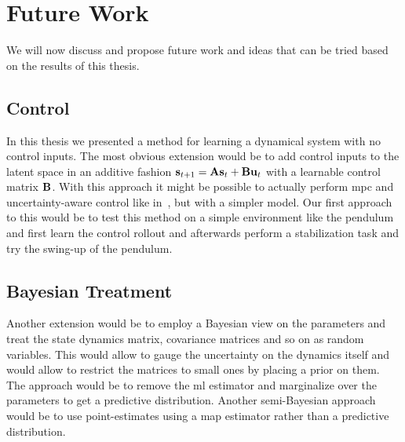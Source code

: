 
%

\section{Future Work}
	\label{sec:futureWork}

	We will now discuss and propose future work and ideas that can be tried based on the results of this thesis.

	\subsection{Control}
		In this thesis we presented a method for learning a dynamical system with no control inputs. The most obvious extension would be to add control inputs to the latent space in an additive fashion \( \boldsymbol{\mathrm{s}}_{t + 1} = \boldsymbol{\mathrm{A}} \boldsymbol{\mathrm{s}}_t + \boldsymbol{\mathrm{B}} \boldsymbol{\mathrm{u}}_t \) with a learnable control matrix \(\boldsymbol{\mathrm{B}}\). With this approach it might be possible to actually perform \ac{mpc} and uncertainty-aware control like in~\cite{mortonDeepVariationalKoopman2019a}, but with a simpler model. Our first approach to this would be to test this method on a simple environment like the pendulum and first learn the control rollout and afterwards perform a stabilization task and try the swing-up of the pendulum.

	\subsection{Bayesian Treatment}
		Another extension would be to employ a Bayesian view on the parameters and treat \eg the state dynamics matrix, covariance matrices and so on as random variables. This would allow to gauge the uncertainty on the dynamics itself and would allow to restrict the matrices to small ones by placing a prior on them. The approach would be to remove the \ac{ml} estimator and marginalize over the parameters to get a predictive distribution. Another semi-Bayesian approach would be to use point-estimates using a \ac{map} estimator rather than a predictive distribution.

